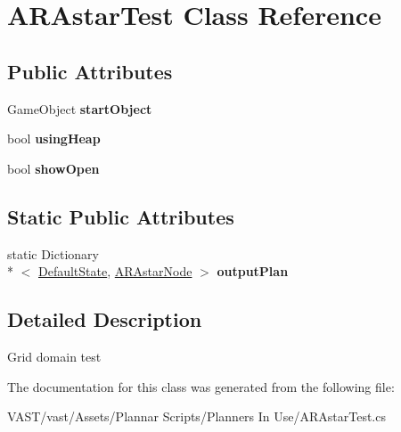 \hypertarget{class_a_r_astar_test}{\section{A\-R\-Astar\-Test Class Reference}
\label{class_a_r_astar_test}
}
\subsection*{Public Attributes}
\begin{DoxyCompactItemize}
\item 
\hypertarget{class_a_r_astar_test_a94aabd1964432001716ad2c0a8a2b86e}{Game\-Object {\bfseries start\-Object}}\label{class_a_r_astar_test_a94aabd1964432001716ad2c0a8a2b86e}

\item 
\hypertarget{class_a_r_astar_test_a58ab930498248f67873fabced04c3319}{bool {\bfseries using\-Heap}}\label{class_a_r_astar_test_a58ab930498248f67873fabced04c3319}

\item 
\hypertarget{class_a_r_astar_test_ac29fdf32984948271bfc5a96c1355d2b}{bool {\bfseries show\-Open}}\label{class_a_r_astar_test_ac29fdf32984948271bfc5a96c1355d2b}

\end{DoxyCompactItemize}
\subsection*{Static Public Attributes}
\begin{DoxyCompactItemize}
\item 
\hypertarget{class_a_r_astar_test_ae544bf76da132907014e8ec57c14167d}{static Dictionary\\*
$<$ \hyperlink{class_default_state}{Default\-State}, \hyperlink{class_a_r_astar_node}{A\-R\-Astar\-Node} $>$ {\bfseries output\-Plan}}\label{class_a_r_astar_test_ae544bf76da132907014e8ec57c14167d}

\end{DoxyCompactItemize}


\subsection{Detailed Description}
Grid domain test 

The documentation for this class was generated from the following file\-:\begin{DoxyCompactItemize}
\item 
V\-A\-S\-T/vast/\-Assets/\-Plannar Scripts/\-Planners In Use/A\-R\-Astar\-Test.\-cs\end{DoxyCompactItemize}
